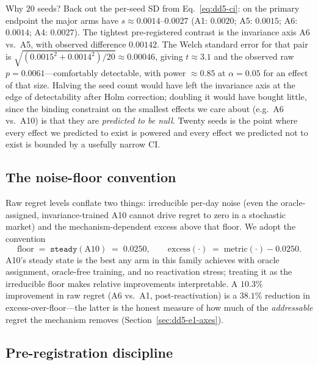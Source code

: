 Why $20$ seeds? Back out the per-seed SD from Eq.~\eqref{eq:dd5-ci}: on the
primary endpoint the major arms have $s \approx 0.0014$--$0.0027$ (A1:
$0.0020$; A5: $0.0015$; A6: $0.0014$; A4: $0.0027$). The tightest
pre-registered contrast is the invariance axis A6 vs.\ A5, with observed
difference $0.00142$. The Welch standard error for that pair is
$\sqrt{(0.0015^2 + 0.0014^2)/20} \approx 0.00046$, giving $t \approx 3.1$ and
the observed raw $p = 0.0061$---comfortably detectable, with power
$\approx 0.85$ at $\alpha = 0.05$ for an effect of that size. Halving the
seed count would have left the invariance axis at the edge of detectability
after Holm correction; doubling it would have bought little, since the
binding constraint on the smallest effects we care about (e.g.\ A6 vs.\ A10)
is that they are \emph{predicted to be null}. Twenty seeds is the point where
every effect we predicted to exist is powered and every effect we predicted
not to exist is bounded by a usefully narrow CI.

\subsection{The noise-floor convention}
\label{sec:dd5-floor}

Raw regret levels conflate two things: irreducible per-day noise (even the
oracle-assigned, invariance-trained A10 cannot drive regret to zero in a
stochastic market) and the mechanism-dependent excess above that floor. We
adopt the convention
\begin{equation}
\text{floor} \;=\; \texttt{steady}(\text{A10}) \;=\; 0.0250, \qquad
\text{excess}(\cdot) \;=\; \text{metric}(\cdot) - 0.0250.
\label{eq:dd5-floor}
\end{equation}
A10's steady state is the best any arm in this family achieves with oracle
assignment, oracle-free training, and no reactivation stress; treating it as
the irreducible floor makes relative improvements interpretable. A $10.3\%$
improvement in raw regret (A6 vs.\ A1, post-reactivation) is a $38.1\%$
reduction in excess-over-floor---the latter is the honest measure of how much
of the \emph{addressable} regret the mechanism removes
(Section~\ref{sec:dd5-e1-axes}).

\subsection{Pre-registration discipline}
\label{sec:dd5-prereg}

